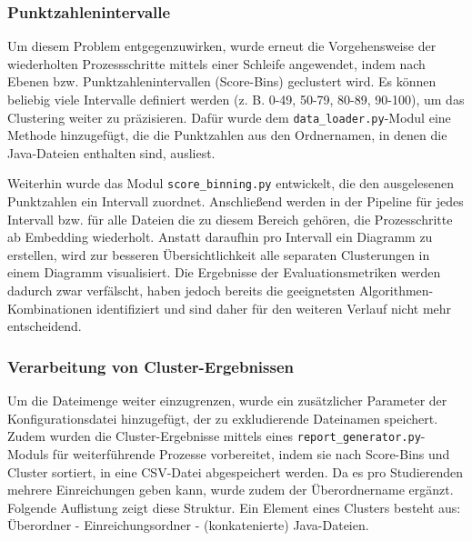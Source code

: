 \subsubsection*{Punktzahlenintervalle}
Um diesem Problem entgegenzuwirken, wurde erneut die Vorgehensweise der wiederholten Prozessschritte mittels einer Schleife angewendet, indem nach Ebenen bzw. Punktzahlenintervallen (Score-Bins) geclustert wird. Es können beliebig viele Intervalle definiert werden (z. B. 0-49, 50-79, 80-89, 90-100), um das Clustering weiter zu präzisieren. Dafür wurde dem \texttt{data\_loader.py}-Modul eine Methode hinzugefügt, die die Punktzahlen aus den Ordnernamen, in denen die Java-Dateien enthalten sind, ausliest.

Weiterhin wurde das Modul \texttt{score\_binning.py} entwickelt, die den ausgelesenen Punktzahlen ein Intervall zuordnet. Anschließend werden in der Pipeline für jedes Intervall bzw. für alle Dateien die zu diesem Bereich gehören, die Prozesschritte ab Embedding wiederholt. Anstatt daraufhin pro Intervall ein Diagramm zu erstellen, wird zur besseren Übersichtlichkeit alle separaten Clusterungen in einem Diagramm visualisiert. Die Ergebnisse der Evaluationsmetriken werden dadurch zwar verfälscht, haben jedoch bereits die geeignetsten Algorithmen-Kombinationen identifiziert und sind daher für den weiteren Verlauf nicht mehr entscheidend.


\subsubsection*{Verarbeitung von Cluster-Ergebnissen}
Um die Dateimenge weiter einzugrenzen, wurde ein zusätzlicher Parameter der Konfigurationsdatei hinzugefügt, der zu exkludierende Dateinamen speichert. Zudem wurden die Cluster-Ergebnisse mittels eines \texttt{report\_generator.py}-Moduls für weiterführende Prozesse vorbereitet, indem sie nach Score-Bins und Cluster sortiert, in eine CSV-Datei abgespeichert werden. Da es pro Studierenden mehrere Einreichungen geben kann, wurde zudem der Überordnername ergänzt. Folgende Auflistung zeigt diese Struktur. Ein Element eines Clusters besteht aus: Überordner - Einreichungsordner - (konkatenierte) Java-Dateien.

